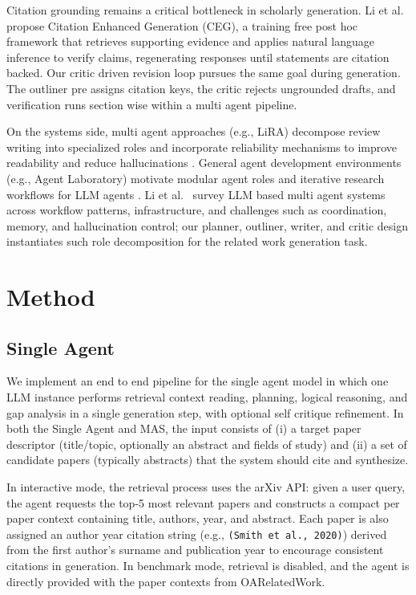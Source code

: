 \documentclass[conference]{IEEEtran}
\begin{document}
Citation grounding remains a critical bottleneck in scholarly generation.
Li et al.~\cite{li2024ceg} propose Citation Enhanced Generation (CEG), a training free post hoc framework that retrieves supporting evidence and applies natural language inference to verify claims, regenerating responses until statements are citation backed.
Our critic driven revision loop pursues the same goal during generation. The outliner pre assigns citation keys, the critic rejects ungrounded drafts, and verification runs section wise within a multi agent pipeline.

On the systems side, multi agent approaches (e.g., LiRA) decompose review writing into specialized roles and incorporate reliability mechanisms to improve readability and reduce hallucinations \cite{lira2025}.
General agent development environments (e.g., Agent Laboratory) motivate modular agent roles and iterative research workflows for LLM agents \cite{agentLaboratory2025}.
Li et al.~\cite{li2024masSurvey} survey LLM based multi agent systems across workflow patterns, infrastructure, and challenges such as coordination, memory, and hallucination control; our planner, outliner, writer, and critic design instantiates such role decomposition for the related work generation task.

\section{Method}
\label{sec:method}

\subsection{Single Agent}
We implement an end to end pipeline for the single agent model in which one LLM instance performs retrieval context reading, planning, logical reasoning, and gap analysis in a single generation step, with optional self critique refinement. In both the Single Agent and MAS, the input consists of (i) a target paper descriptor (title/topic, optionally an abstract and fields of study) and (ii) a set of candidate papers (typically abstracts) that the system should cite and synthesize.

In interactive mode, the retrieval process uses the arXiv API: given a user query, the agent requests the top-5 most relevant papers and constructs a compact per paper context containing title, authors, year, and abstract. Each paper is also assigned an author year citation string (e.g., \texttt{(Smith et al., 2020)}) derived from the first author's surname and publication year to encourage consistent citations in generation. In benchmark mode, retrieval is disabled, and the agent is directly provided with the paper contexts from OARelatedWork.
\end{document}
